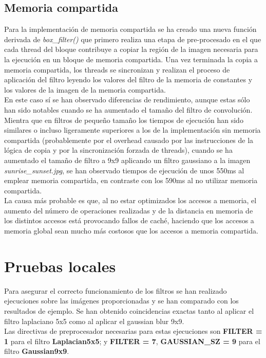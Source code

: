 \documentclass[10pt,oneside,a4paper]{article}
\begin{document}
\subsection{Memoria compartida}
Para la implementación de memoria compartida se ha creado una nueva función derivada de \textit{box\_filter()} que primero realiza una etapa de pre-procesado en el que cada thread del bloque contribuye a copiar la región de la imagen necesaria para la ejecución en un bloque de memoria compartida. Una vez terminada la copia a memoria compartida, los threads se sincronizan y realizan el proceso de aplicación del filtro leyendo los valores del filtro de la memoria de constantes y los valores de la imagen de la memoria compartida.\\

En este caso sí se han observado diferencias de rendimiento, aunque estas sólo han sido notables cuando se ha aumentado el tamaño del filtro de convolución. Mientra que en filtros de pequeño tamaño los tiempos de ejecución han sido similares o incluso ligeramente superiores a los de la implementación sin memoria compartida (probablemente por el overhead causado por las instrucciones de la lógica de copia y por la sincronización forzada de threads), cuando se ha aumentado el tamaño de filtro a 9x9 aplicando un filtro gaussiano a la imagen \textit{sunrise\_sunset.jpg}, se han observado tiempos de ejecución de unos 550ms al emplear memoria compartida, en contraste con los 590ms al no utilizar memoria compartida.\\

La causa más probable es que, al no estar optimizados los accesos a memoria, el aumento del número de operaciones realizadas y de la distancia en memoria de los distintos accesos está provocando fallos de caché, haciendo que los accesos a memoria global sean mucho más costosos que los accesos a memoria compartida.

\section{Pruebas locales}
Para asegurar el correcto funcionamiento de los filtros se han realizado ejecuciones sobre las imágenes proporcionadas y se han comparado con los resultados de ejemplo. Se han obtenido coincidencias exactas tanto al aplicar el filtro laplaciano 5x5 como al aplicar el gaussian blur 9x9.\\

Las directivas de preprocesador necesarias para estas ejecuciones son \textbf{FILTER = 1} para el filtro \textbf{Laplacian5x5}; y \textbf{FILTER = 7}, \textbf{GAUSSIAN\_SZ = 9} para el filtro \textbf{Gaussian9x9}.
\end{document}
